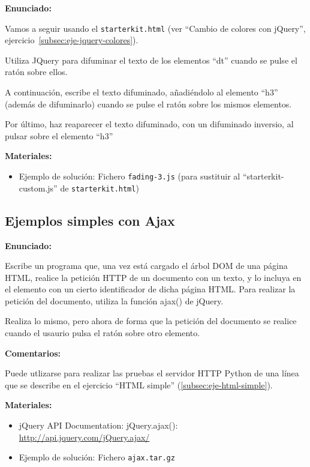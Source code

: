 \textbf{Enunciado:}

Vamos a seguir usando el \verb|starterkit.html| (ver ``Cambio de colores con jQuery'', ejercicio~\ref{subsec:eje-jquery-colores}).

Utiliza JQuery para difuminar el texto de los elementos ``dt'' cuando se pulse el ratón sobre ellos.

A continuación, escribe el texto difuminado, añadiéndolo al elemento ``h3'' (además de difuminarlo) cuando se pulse el ratón sobre los mismos elementos.

Por último, haz reaparecer el texto difuminado, con un difuminado inversio, al pulsar sobre el elemento ``h3''


\textbf{Materiales:}

\begin{itemize}
\item Ejemplo de solución: Fichero \verb|fading-3.js|
  (para sustituir al ``starterkit-custom.js'' de \verb|starterkit.html|)
\end{itemize}


\subsection{Ejemplos simples con Ajax}
\label{subsec:eje-jquery-ajax}

\textbf{Enunciado:}

Escribe un programa que, una vez está cargado el árbol DOM de una página HTML, realice la petición HTTP de un documento con un texto, y lo incluya en el elemento con un cierto identificador de dicha página HTML. Para realizar la petición del documento, utiliza la función ajax() de jQuery.

Realiza lo mismo, pero ahora de forma que la petición del documento se realice cuando el usaurio pulsa el ratón sobre otro elemento.

\textbf{Comentarios:}

Puede utlizarse para realizar las pruebas el servidor HTTP Python de una línea que se describe en el ejercicio ``HTML simple'' (\ref{subsec:eje-html-simple}).

\textbf{Materiales:}

\begin{itemize}
\item jQuery API Documentation: jQuery.ajax(): \\
  \url{http://api.jquery.com/jQuery.ajax/}
\item Ejemplo de solución: Fichero \verb|ajax.tar.gz|
\end{itemize}

